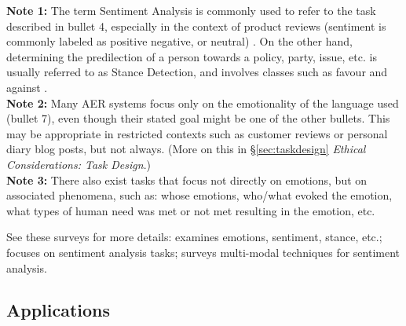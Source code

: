 \documentclass{clv3}
\begin{document}
\vspace*{-2mm}
\noindent \textbf{Note 1:} The term Sentiment Analysis is commonly used to refer to the task described in bullet 4, especially in the context of product reviews (sentiment is commonly labeled as positive negative, or neutral) \cite{turney-2002-thumbs, pang-etal-2002-thumbs}. On the other hand, determining the predilection of a person towards a policy, party, issue, etc. is usually referred to as Stance Detection, and involves classes such as favour and against \cite{StanceSemEval2016,MohammadSK17}.\\[3pt]
\noindent \textbf{Note 2:} Many AER systems focus only on the emotionality of the language used (bullet 7), even though their stated goal might be one of the other bullets. This may be appropriate in restricted contexts such as customer reviews or personal diary blog posts, but not always. (More on this in \S\ref{sec:taskdesign} \textit{Ethical Considerations: Task Design}.)\\[3pt]
\noindent \textbf{Note 3:} There also exist tasks that focus not directly on emotions, but on associated phenomena, such as: whose emotions, who/what evoked the emotion, what types of human need was met or not met resulting in the emotion, etc.

See these surveys for more details: \citet{mohammad2020survey} examines emotions, sentiment, stance, etc.; \citet{zhang2018deep} focuses on sentiment analysis tasks; \citet{soleymani2017survey} surveys multi-modal techniques for sentiment analysis.

\subsection{Applications}
\label{sec:applications}
\end{document}
